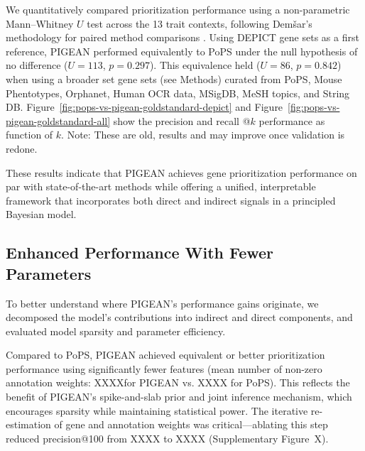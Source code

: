 \documentclass[sn-nature,lineno]{sn-jnl}%
\theoremstyle{thmstyleone}%
\theoremstyle{thmstyletwo}%
\theoremstyle{thmstylethree}%
\begin{document}
We quantitatively compared prioritization performance using a non-parametric Mann–Whitney $U$ test across the 13 trait contexts, following Demšar's methodology for paired method comparisons \cite{demsar_statistical_2006}. Using DEPICT gene sets as a first reference, PIGEAN performed equivalently to PoPS under the null hypothesis of no difference ($U = 113$, $p = 0.297$). This equivalence held ($U = 86$, $p = 0.842$) when using a broader set gene sets (see Methods) curated from PoPS, Mouse Phentotypes, Orphanet, Human OCR data, MSigDB, MeSH topics, and String DB. Figure~\ref{fig:pops-vs-pigean-goldstandard-depict} and Figure~\ref{fig:pops-vs-pigean-goldstandard-all} show the precision and recall @$k$ performance as function of $k$. Note: These are old, results and may improve once validation is redone. 

These results indicate that PIGEAN achieves gene prioritization performance on par with state-of-the-art methods while offering a unified, interpretable framework that incorporates both direct and indirect signals in a principled Bayesian model.

\subsection{Enhanced Performance With Fewer Parameters}


To better understand where PIGEAN's performance gains originate, we decomposed the model's contributions into indirect and direct components, and evaluated model sparsity and parameter efficiency.

Compared to PoPS, PIGEAN achieved equivalent or better prioritization performance using significantly fewer features (mean number of non-zero annotation weights: XXXXfor PIGEAN vs. XXXX for PoPS). This reflects the benefit of PIGEAN’s spike-and-slab prior and joint inference mechanism, which encourages sparsity while maintaining statistical power. The iterative re-estimation of gene and annotation weights was critical—ablating this step reduced precision@100 from XXXX to XXXX (Supplementary Figure~X).
\end{document}
